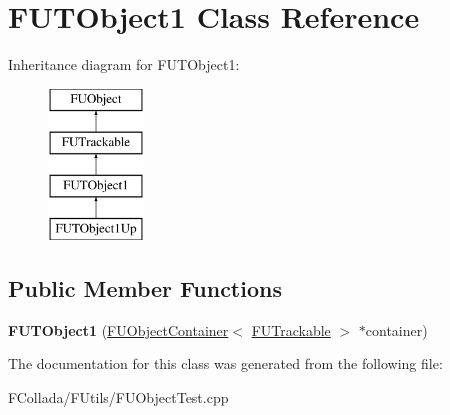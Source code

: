 \hypertarget{classFUTObject1}{
\section{FUTObject1 Class Reference}
\label{classFUTObject1}
}
Inheritance diagram for FUTObject1:\begin{figure}[H]
\begin{center}
\leavevmode
\includegraphics[height=4.000000cm]{classFUTObject1}
\end{center}
\end{figure}
\subsection*{Public Member Functions}
\begin{DoxyCompactItemize}
\item 
\hypertarget{classFUTObject1_a0ab99b7c4746a5c3df4bcb94fd07669a}{
{\bfseries FUTObject1} (\hyperlink{classFUObjectContainer}{FUObjectContainer}$<$ \hyperlink{classFUTrackable}{FUTrackable} $>$ $\ast$container)}
\label{classFUTObject1_a0ab99b7c4746a5c3df4bcb94fd07669a}

\end{DoxyCompactItemize}


The documentation for this class was generated from the following file:\begin{DoxyCompactItemize}
\item 
FCollada/FUtils/FUObjectTest.cpp\end{DoxyCompactItemize}
